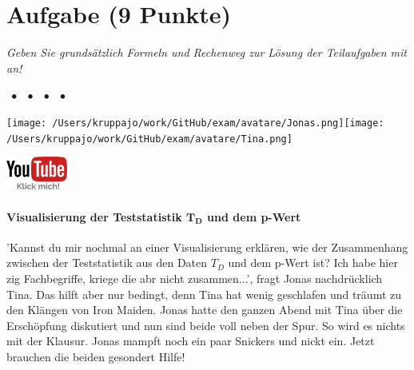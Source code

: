 \documentclass[a4paper, 9pt]{scrartcl}\usepackage[]{graphicx}\usepackage[]{xcolor}
\begin{document}
 
\clearpage

\section{Aufgabe \hfill (9 Punkte)}

\textit{Geben Sie grundsätzlich Formeln und Rechenweg zur Lösung der Teilaufgaben mit an!} \\[1Ex]


 
\ifcollection
\begin{flushright}
\tiny\vspace{-3Ex}
\textbf{\examinhaltstart}
\exammodulemathstat $\;\bullet$
\exammodulestat $\;\bullet$
\exammodulestatbbv $\;\bullet$
\exammodulestatversuch $\;\bullet$
\exammodulebiostat
\vspace{-4Ex}
\end{flushright}
\begin{minipage}[t]{0.5\textwidth}
\texttt{[image: /Users/kruppajo/work/GitHub/exam/avatare/Jonas.png]}\hspace{-4mm}\texttt{[image: /Users/kruppajo/work/GitHub/exam/avatare/Tina.png]}
\end{minipage}
\begin{minipage}[t]{0.5\textwidth}
\hfill
\href{https://youtu.be/32JjH1eyuTU}{\includegraphics[width = 2cm]{img/youtube}}
\end{minipage}
\fi



\ifcollection
\paragraph{Visualisierung der Teststatistik $\boldsymbol{T_D}$ und dem p-Wert}
\fi

'Kannst du mir nochmal an einer Visualisierung erklären, wie der Zusammenhang zwischen der Teststatistik aus den Daten $T_D$ und dem p-Wert ist? Ich habe hier zig Fachbegriffe, kriege die abr nicht zusammen...', fragt Jonas nachdrücklich  Tina. Das hilft aber nur bedingt, denn Tina hat wenig geschlafen und träumt zu den Klängen von Iron Maiden. Jonas hatte den ganzen Abend mit Tina über die Erschöpfung diskutiert und nun sind beide voll neben der Spur. So wird es nichts mit der Klausur. Jonas mampft noch ein paar Snickers und nickt ein. Jetzt brauchen die beiden gesondert Hilfe!
\end{document}
